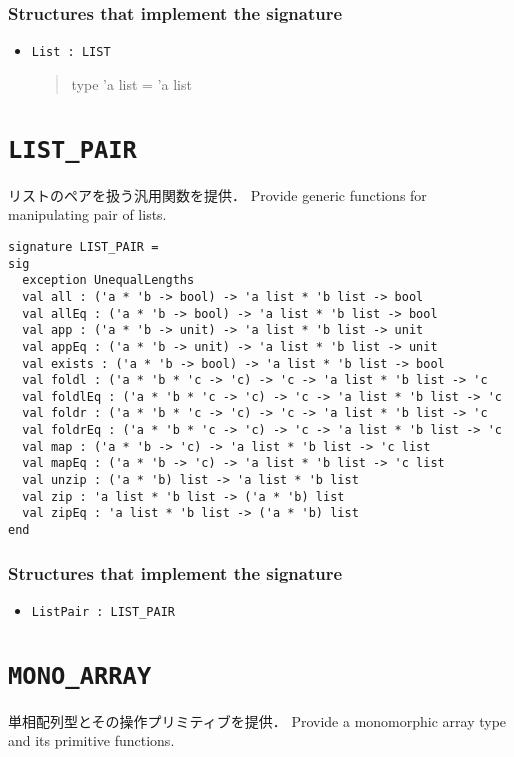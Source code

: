 \documentclass{jbook}
\newcommand{\txt}[2]{#2}
\newcommand{\code}[1]{\mbox{\large\tt #1}}
\newenvironment{program}{\begin{quote}\begin{tt}}%
                        {\end{tt}\end{quote}}
\newcommand{\signature}[2]{
\section{{\tt #1}}\label{section:reference:#2}
}
\newcommand{\Structure}{\subsubsection*{\txt{シグネチャを実装するストラクチャ}{Structures that implement the signature}}}
\begin{document}
\Structure
\begin{itemize}
\item \code{List : LIST}
\begin{program}
   type 'a list = 'a list
\end{program}
\end{itemize}

\signature{LIST\_PAIR}{LISTPAIR}
\ifjp%
	リストのペアを扱う汎用関数を提供．
\else%
	Provide generic functions for manipulating pair of lists.
\fi%

\begin{verbatim}
signature LIST_PAIR =
sig
  exception UnequalLengths
  val all : ('a * 'b -> bool) -> 'a list * 'b list -> bool
  val allEq : ('a * 'b -> bool) -> 'a list * 'b list -> bool
  val app : ('a * 'b -> unit) -> 'a list * 'b list -> unit
  val appEq : ('a * 'b -> unit) -> 'a list * 'b list -> unit
  val exists : ('a * 'b -> bool) -> 'a list * 'b list -> bool
  val foldl : ('a * 'b * 'c -> 'c) -> 'c -> 'a list * 'b list -> 'c
  val foldlEq : ('a * 'b * 'c -> 'c) -> 'c -> 'a list * 'b list -> 'c
  val foldr : ('a * 'b * 'c -> 'c) -> 'c -> 'a list * 'b list -> 'c
  val foldrEq : ('a * 'b * 'c -> 'c) -> 'c -> 'a list * 'b list -> 'c
  val map : ('a * 'b -> 'c) -> 'a list * 'b list -> 'c list
  val mapEq : ('a * 'b -> 'c) -> 'a list * 'b list -> 'c list
  val unzip : ('a * 'b) list -> 'a list * 'b list
  val zip : 'a list * 'b list -> ('a * 'b) list
  val zipEq : 'a list * 'b list -> ('a * 'b) list
end
\end{verbatim}

\Structure
\begin{itemize}
\item \code{ListPair : LIST\_PAIR}
\end{itemize}


\signature{MONO\_ARRAY}{MONOARRAY}
\ifjp%
	単相配列型とその操作プリミティブを提供．
\else%
	Provide a monomorphic array type and its primitive functions.
\fi%
\end{document}
